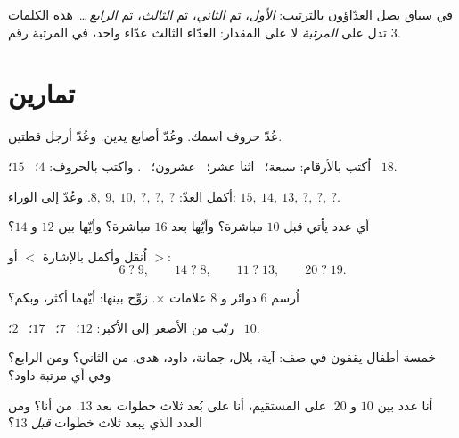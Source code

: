 \begin{example}\label{ex:g1:counting:ordinal}
في سباق يصل العدّاؤون بالترتيب: \emph{الأول}، ثم
\emph{الثاني}، ثم \emph{الثالث}، ثم \emph{الرابع}\,\dots\ هذه
الكلمات تدل على \emph{المرتبة} لا على المقدار: العدّاء الثالث
عدّاء واحد، في المرتبة رقم $3$.
\end{example}

\section{تمارين}

\begin{exercise}[$\star$]\label{exo:g1:counting:1}
عُدّ حروف اسمك. وعُدّ أصابع يدين. وعُدّ أرجل قطتين.
\end{exercise}

\begin{exercise}[$\star$]\label{exo:g1:counting:2}
اُكتب بالأرقام: سبعة؛ \ اثنا عشر؛ \ عشرون؛ \ . واكتب بالحروف:
$4$؛ \ $15$؛ \ $18$.
\end{exercise}

\begin{exercise}[$\star$]\label{exo:g1:counting:3}
أكمل العدّ: $8,\ 9,\ 10,\ ?,\ ?,\ ?$. وعُدّ إلى الوراء:
$15,\ 14,\ 13,\ ?,\ ?,\ ?$.
\end{exercise}

\begin{exercise}[$\star$]\label{exo:g1:counting:4}
أي عدد يأتي قبل $10$ مباشرة؟ وأيّها بعد $16$ مباشرة؟ وأيّها بين
$12$ و $14$؟
\end{exercise}

\begin{exercise}[$\star$]\label{exo:g1:counting:5}
اُنقل وأكمل بالإشارة $<$ أو $>$:
\[
6 \;?\; 9, \qquad
14 \;?\; 8, \qquad
11 \;?\; 13, \qquad
20 \;?\; 19 .
\]
\end{exercise}

\begin{exercise}[$\star$]\label{exo:g1:counting:6}
اُرسم $6$ دوائر و $8$ علامات ×. زوِّج بينها: أيّهما أكثر، وبكم؟
\end{exercise}

\begin{exercise}[$\star$]\label{exo:g1:counting:7}
رتّب من الأصغر إلى الأكبر: $12$؛ \ $7$؛ \ $17$؛ \ $2$؛ \ $10$.
\end{exercise}

\begin{exercise}[$\star$]\label{exo:g1:counting:8}
خمسة أطفال يقفون في صف: آية، بلال، جمانة، داود، هدى. من الثاني؟
ومن الرابع؟ وفي أي مرتبة داود؟
\end{exercise}

\begin{exercise}[$\star\star$]\label{exo:g1:counting:9}
أنا عدد بين $10$ و $20$. على المستقيم، أنا على بُعد ثلاث خطوات بعد
$13$. من أنا؟ ومن العدد الذي يبعد ثلاث خطوات \emph{قبل}
$13$؟
\end{exercise}
